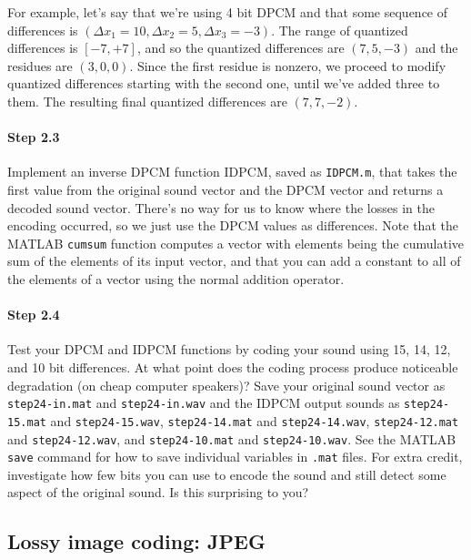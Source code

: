 For example, let's say that we're using 4 bit DPCM and that some
sequence of differences is $(\Delta x_1=10, \Delta x_2=5, \Delta
x_3=-3)$. The range of quantized differences is $[-7, +7]$, and so the
quantized differences are $(7, 5, -3)$ and the residues are $(3, 0,
0)$. Since the first residue is nonzero, we proceed to modify quantized
differences starting with the second one, until we've added three to
them. The resulting final quantized differences are $(7, 7, -2)$.

\paragraph{Step 2.3} Implement an inverse DPCM function IDPCM, saved
as \texttt{IDPCM.m}, that takes the first value from the original
sound vector and the DPCM vector and returns a decoded sound
vector. There's no way for us to know where the losses in the encoding
occurred, so we just use the DPCM values as differences. Note that the
MATLAB \texttt{cumsum} function computes a vector with elements being
the cumulative sum of the elements of its input vector, and that you
can add a constant to all of the elements of a vector using the normal
addition operator.

\paragraph{Step 2.4} Test your DPCM and IDPCM functions by coding your
sound using 15, 14, 12, and 10 bit differences. At what point does the
coding process produce noticeable degradation (on cheap computer
speakers)? Save your original sound vector as \texttt{step24-in.mat}
and \texttt{step24-in.wav} and the IDPCM output sounds as
\texttt{step24-15.mat} and \texttt{step24-15.wav},
\texttt{step24-14.mat} and \texttt{step24-14.wav}, \texttt{step24-12.mat}
and \texttt{step24-12.wav}, and \texttt{step24-10.mat} and
\texttt{step24-10.wav}. See the MATLAB \texttt{save} command for how to
save individual variables in \texttt{.mat} files. For extra credit,
investigate how few bits you can use to encode the sound and still
detect some aspect of the original sound. Is this surprising to you?

\subsection{Lossy image coding: JPEG}

